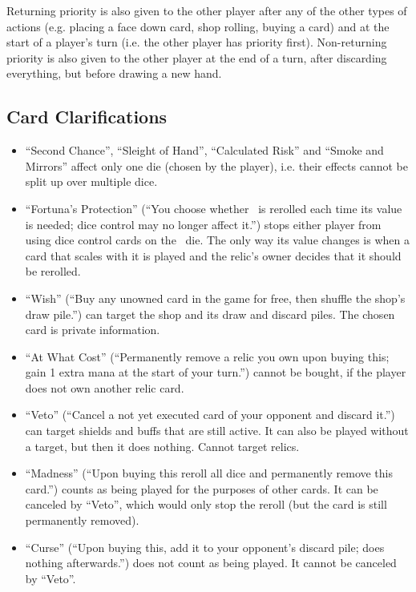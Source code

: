 \documentclass[dvipsnames,parskip,a4paper]{scrartcl}
\newcommand{\iconsize}{3.4mm}
\newcommand{\icondepth}{0.45mm}
\newcommand{\icon}[1]{\raisebox{-\icondepth}{\texttt{[image:  \#1 ]}}}
\newcommand{\chance}{\icon{icons/chance.png}}
\begin{document}
\vspace{4pt}

Returning priority is also given to the other player after any of the other types of actions (e.g. placing a face down card, shop rolling, buying a card) and at the start of a player's turn (i.e. the other player has priority first). Non-returning priority is also given to the other player at the end of a turn, after discarding everything, but before drawing a new hand.

\newpage

\subsection*{Card Clarifications}

\begin{itemize}
\item ``Second Chance'', ``Sleight of Hand'', ``Calculated Risk'' and ``Smoke and Mirrors'' affect only one die (chosen by the player), i.e. their effects cannot be split up over multiple dice.
\item ``Fortuna's Protection'' (``You choose whether \chance \ is rerolled each time its value is needed; dice control may no longer affect it.'') stops either player from using dice control cards on the \chance \ die. The only way its value changes is when a card that scales with it is played and the relic's owner decides that it should be rerolled.
\item ``Wish'' (``Buy any unowned card in the game for free, then shuffle the shop's draw pile.'') can target the shop and its draw and discard piles. The chosen card is private information.
\item ``At What Cost'' (``Permanently remove a relic you own upon buying this; gain 1 extra mana at the start of your turn.'') cannot be bought, if the player does not own another relic card.
\item ``Veto'' (``Cancel a not yet executed card of your opponent and discard it.'')  can target shields and buffs that are still active. It can also be played without a target, but then it does nothing. Cannot target relics.
\item ``Madness'' (``Upon buying this reroll all dice and permanently remove this card.'') counts as being played for the purposes of other cards. It can be canceled by ``Veto'', which would only stop the reroll (but the card is still permanently removed). 
\item ``Curse'' (``Upon buying this, add it to your opponent's discard pile; does nothing afterwards.'') does not count as being played. It cannot be canceled by ``Veto''.
\end{itemize}
\end{document}
